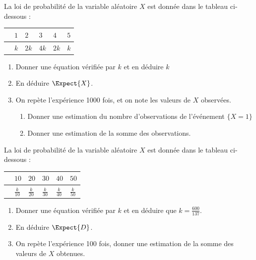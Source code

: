 \documentclass[main.tex]{subfiles}
\begin{document}
\begin{exercise}
	La loi de probabilité de la variable aléatoire $X$ est donnée dans le tableau ci-dessous :\\
	\renewcommand{\arraystretch}{1.25} 
	\null	\hfill \begin{tabularx}{0.7\linewidth}{|c|Y|Y|Y|Y|Y|}
		\hline
		 & $1$ & $2$ & $3$ & $4$ & $5$ \\ \hline
		 & $k$ & $2k$  & $4k$  & $2k$& $k$ \\\hline
	\end{tabularx} 
	\hfill \null
	\begin{enumerate}[leftmargin=*,label=\arabic*)]
		\item Donner une équation vérifiée par $k$ et en déduire $k$
		\item En déduire $\Expect{X}$.
		\item On repète l'expérience 1000 fois, et on note les valeurs de $X$ observées.
		\begin{enumerate}
			\item Donner une estimation du nombre d'observations de l'événement $\{X=1\}$
			\item Donner une estimation de la somme des observations.
		\end{enumerate}
	\end{enumerate} 
\end{exercise} 
\begin{exercise}
	La loi de probabilité de la variable aléatoire $X$ est donnée dans le tableau ci-dessous :\\
	\renewcommand{\arraystretch}{1.2} 
	\null	\hfill \begin{tabularx}{0.7\linewidth}{|c|Y|Y|Y|Y|Y|}
		\hline
		 & $10$ & $20$ & $30$ & $40$ & $50$ \\ \hline
		 & $\tfrac{k}{10}$ & $\tfrac{k}{20}$  & $\tfrac{k}{30}$  & $\tfrac{k}{40}$& $\tfrac{k}{50}$ \\\hline
	\end{tabularx} 
	\hfill \null
	\begin{enumerate}[leftmargin=*,label=\arabic*)]
		\item Donner une équation vérifiée par $k$ et en déduire que $k=\frac{600}{137}$.
		\item En déduire $\Expect{D}$.
		\item On repète l'expérience 100 fois, donner une estimation de la somme des valeurs de $X$ obtenues.
	\end{enumerate} 
\end{exercise}  
\end{document}
